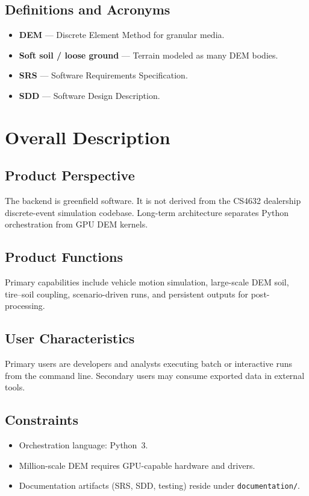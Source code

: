 \documentclass[conference]{IEEEtran}
\begin{document}
\subsection{Definitions and Acronyms}
\begin{itemize}
  \item \textbf{DEM} --- Discrete Element Method for granular media.
  \item \textbf{Soft soil / loose ground} --- Terrain modeled as many DEM bodies.
  \item \textbf{SRS} --- Software Requirements Specification.
  \item \textbf{SDD} --- Software Design Description.
\end{itemize}

\section{Overall Description}

\subsection{Product Perspective}
The backend is greenfield software. It is not derived from the CS4632 dealership
discrete-event simulation codebase. Long-term architecture separates Python
orchestration from GPU DEM kernels.

\subsection{Product Functions}
Primary capabilities include vehicle motion simulation, large-scale DEM soil,
tire--soil coupling, scenario-driven runs, and persistent outputs for
post-processing.

\subsection{User Characteristics}
Primary users are developers and analysts executing batch or interactive runs
from the command line. Secondary users may consume exported data in external
tools.

\subsection{Constraints}
\begin{itemize}
  \item Orchestration language: Python~3.
  \item Million-scale DEM requires GPU-capable hardware and drivers.
  \item Documentation artifacts (SRS, SDD, testing) reside under
        \texttt{documentation/}.
\end{itemize}
\end{document}
